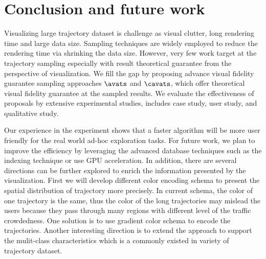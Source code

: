 \section{Conclusion and future work}\label{sec:con}

Visualizing large trajectory dataset is challenge as visual clutter, long rendering time and large data size.
Sampling techniques are widely employed to reduce the rendering time via shrinking the data size.
However, very few work target at the trajectory sampling especially with result theoretical guarantee from the perspective of visualization.
We fill the gap by proposing advance visual fidelity guarantee sampling approaches $\avats$ and $\cavats$, which offer theoretical visual fidelity guarantee at the sampled results.
We evaluate the effectiveness of proposals  by extensive experimental studies, includes case study, user study, and qualitative study.



Our experience in the experiment shows that a faster algorithm will be more user friendly for the real world ad-hoc exploration tasks.
For future work, we plan to improve the efficiency by leveraging the advanced database techniques such as the indexing technique or use GPU acceleration.
In addition, there are several directions can be further explored to enrich the information presented by the visualization.
First we will develop different color encoding schema to present the spatial distribution of trajectory more precisely.
In current schema, the color of one trajectory is the same, thus the color of the long trajectories may mislead the users because they pass through many regions with different level of the traffic crowdedness. One solution is to use gradient color schema to encode the trajectories.
Another interesting direction is to extend the approach to support the mulit-class characteristics which is a commonly existed in variety of trajectory dataset. 